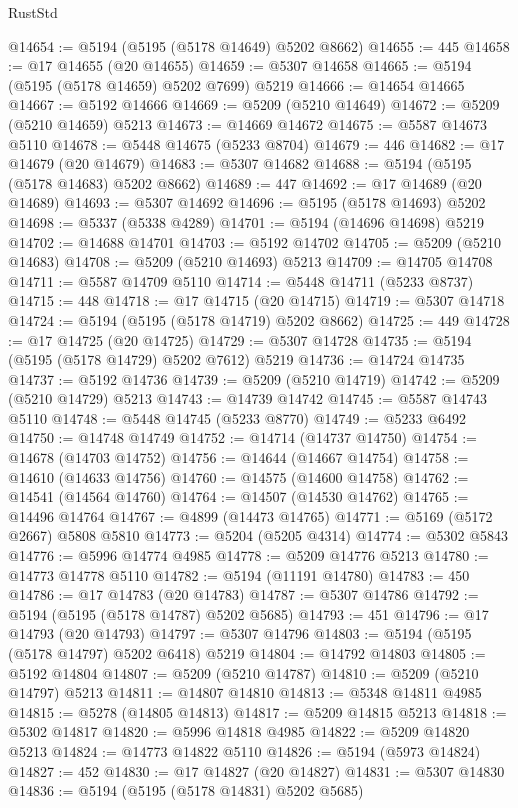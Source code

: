 \begin{lexlean}{RustStd}
\begin{coremodule}
@14654 := @5194 (@5195 (@5178 @14649) @5202 @8662)
@14655 := 445
@14658 := @17 @14655 (@20 @14655)
@14659 := @5307 @14658
@14665 := @5194 (@5195 (@5178 @14659) @5202 @7699) @5219
@14666 := @14654 @14665
@14667 := @5192 @14666
@14669 := @5209 (@5210 @14649)
@14672 := @5209 (@5210 @14659) @5213
@14673 := @14669 @14672
@14675 := @5587 @14673 @5110
@14678 := @5448 @14675 (@5233 @8704)
@14679 := 446
@14682 := @17 @14679 (@20 @14679)
@14683 := @5307 @14682
@14688 := @5194 (@5195 (@5178 @14683) @5202 @8662)
@14689 := 447
@14692 := @17 @14689 (@20 @14689)
@14693 := @5307 @14692
@14696 := @5195 (@5178 @14693) @5202
@14698 := @5337 (@5338 @4289)
@14701 := @5194 (@14696 @14698) @5219
@14702 := @14688 @14701
@14703 := @5192 @14702
@14705 := @5209 (@5210 @14683)
@14708 := @5209 (@5210 @14693) @5213
@14709 := @14705 @14708
@14711 := @5587 @14709 @5110
@14714 := @5448 @14711 (@5233 @8737)
@14715 := 448
@14718 := @17 @14715 (@20 @14715)
@14719 := @5307 @14718
@14724 := @5194 (@5195 (@5178 @14719) @5202 @8662)
@14725 := 449
@14728 := @17 @14725 (@20 @14725)
@14729 := @5307 @14728
@14735 := @5194 (@5195 (@5178 @14729) @5202 @7612) @5219
@14736 := @14724 @14735
@14737 := @5192 @14736
@14739 := @5209 (@5210 @14719)
@14742 := @5209 (@5210 @14729) @5213
@14743 := @14739 @14742
@14745 := @5587 @14743 @5110
@14748 := @5448 @14745 (@5233 @8770)
@14749 := @5233 @6492
@14750 := @14748 @14749
@14752 := @14714 (@14737 @14750)
@14754 := @14678 (@14703 @14752)
@14756 := @14644 (@14667 @14754)
@14758 := @14610 (@14633 @14756)
@14760 := @14575 (@14600 @14758)
@14762 := @14541 (@14564 @14760)
@14764 := @14507 (@14530 @14762)
@14765 := @14496 @14764
@14767 := @4899 (@14473 @14765)
@14771 := @5169 (@5172 @2667) @5808 @5810
@14773 := @5204 (@5205 @4314)
@14774 := @5302 @5843
@14776 := @5996 @14774 @4985
@14778 := @5209 @14776 @5213
@14780 := @14773 @14778 @5110
@14782 := @5194 (@11191 @14780)
@14783 := 450
@14786 := @17 @14783 (@20 @14783)
@14787 := @5307 @14786
@14792 := @5194 (@5195 (@5178 @14787) @5202 @5685)
@14793 := 451
@14796 := @17 @14793 (@20 @14793)
@14797 := @5307 @14796
@14803 := @5194 (@5195 (@5178 @14797) @5202 @6418) @5219
@14804 := @14792 @14803
@14805 := @5192 @14804
@14807 := @5209 (@5210 @14787)
@14810 := @5209 (@5210 @14797) @5213
@14811 := @14807 @14810
@14813 := @5348 @14811 @4985
@14815 := @5278 (@14805 @14813)
@14817 := @5209 @14815 @5213
@14818 := @5302 @14817
@14820 := @5996 @14818 @4985
@14822 := @5209 @14820 @5213
@14824 := @14773 @14822 @5110
@14826 := @5194 (@5973 @14824)
@14827 := 452
@14830 := @17 @14827 (@20 @14827)
@14831 := @5307 @14830
@14836 := @5194 (@5195 (@5178 @14831) @5202 @5685)

\end{coremodule}
\end{lexlean}
